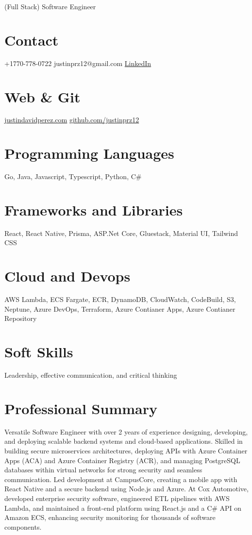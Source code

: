\documentclass[]{friggeri-cv}
\begin{document}
      {(Full Stack) Software Engineer}

\begin{aside}
  \section{Contact}
    +1770-778-0722
    justinprz12@gmail.com
    \href{https://www.linkedin.com/in/justindperez/}{LinkedIn}
    ~
  \section{Web \& Git}
    \href{http://www.justindavidperez.com}{justindavidperez.com}
    \href{https://github.com/JustinPerez12}{github.com/justinprz12}
  \section{Programming Languages}
    Go, Java, Javascript, Typescript, Python, C\#
  \section{Frameworks and Libraries}
    React, React Native, Prisma, ASP.Net Core, Gluestack, Material UI, Tailwind CSS
  \section{Cloud and Devops}
    AWS Lambda, ECS Fargate, ECR, DynamoDB, CloudWatch, CodeBuild, S3, Neptune, Azure DevOps, Terraform, Azure Contianer Apps, Azure Contianer Repository
  \section{Soft Skills}
    Leadership, effective communication, and critical thinking
\end{aside}

\section{Professional Summary}
Versatile Software Engineer with over 2 years of experience designing, developing, and deploying scalable backend systems and cloud-based applications. Skilled in building secure microservices architectures, deploying APIs with Azure Container Apps (ACA) and Azure Container Registry (ACR), and managing PostgreSQL databases within virtual networks for strong security and seamless communication. Led development at CampusCore, creating a mobile app with React Native and a secure backend using Node.js and Azure. At Cox Automotive, developed enterprise security software, engineered ETL pipelines with AWS Lambda, and maintained a front-end platform using React.js and a C\# API on Amazon ECS, enhancing security monitoring for thousands of software components.
\end{document}
